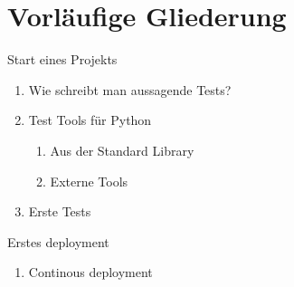 \section{Vorläufige Gliederung}
    \item Start eines Projekts
    \begin{enumerate}[label*=\arabic*.]
        \item Wie schreibt man aussagende Tests?
        \item Test Tools für Python
        \begin{enumerate}[label*=\arabic*.]
            \item Aus der Standard Library
            \item Externe Tools
        \end{enumerate}
        \item Erste Tests
   \end{enumerate}
    \item Erstes deployment
        \begin{enumerate}[label*=\arabic*.]
        \item Continous deployment
\end{enumerate}